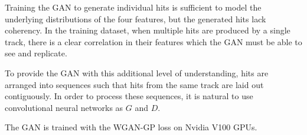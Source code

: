 Training the GAN to generate individual hits is sufficient to model the underlying distributions of the four features, but the generated hits lack coherency. In the training dataset, when multiple hits are produced by a single track, there is a clear correlation in their features which the GAN must be able to see and replicate.

To provide the GAN with this additional level of understanding, hits are arranged into sequences such that hits from the same track are laid out contiguously. In order to process these sequences, it is natural to use convolutional neural networks as $G$ and $D$. 


The GAN is trained with the WGAN-GP loss on Nvidia V100 GPUs.











